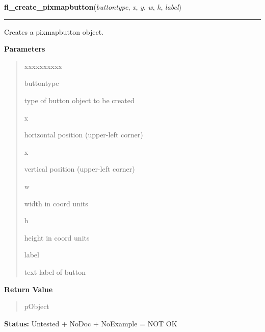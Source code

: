     \label{xformslib:library:fl_create_pixmapbutton}

    \vspace{0.5ex}

\hspace{.8\funcindent}\begin{boxedminipage}{\funcwidth}

    \raggedright \textbf{fl\_create\_pixmapbutton}(\textit{buttontype}, \textit{x}, \textit{y}, \textit{w}, \textit{h}, \textit{label})

    \vspace{-1.5ex}

    \rule{\textwidth}{0.5\fboxrule}
\setlength{\parskip}{2ex}
    Creates a pixmapbutton object.

\setlength{\parskip}{1ex}
      \textbf{Parameters}
      \vspace{-1ex}

      \begin{quote}
        \begin{Ventry}{xxxxxxxxxx}

          \item[buttontype]

          type of button object to be created

          \item[x]

          horizontal position (upper-left corner)

          \item[x]

          vertical position (upper-left corner)

          \item[w]

          width in coord units

          \item[h]

          height in coord units

          \item[label]

          text label of button

        \end{Ventry}

      \end{quote}

      \textbf{Return Value}
    \vspace{-1ex}

      \begin{quote}
      pObject

      \end{quote}

\textbf{Status:} Untested + NoDoc + NoExample = NOT OK



    \end{boxedminipage}

